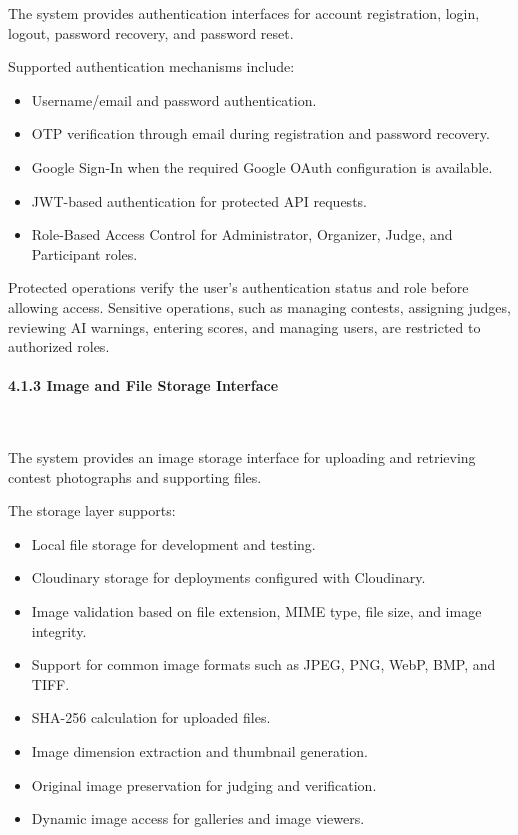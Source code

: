 The system provides authentication interfaces for account registration, login, logout, password recovery, and password reset.

Supported authentication mechanisms include:

\begin{itemize}[leftmargin=1.5em, nosep]
    \item Username/email and password authentication.
    \item OTP verification through email during registration and password recovery.
    \item Google Sign-In when the required Google OAuth configuration is available.
    \item JWT-based authentication for protected API requests.
    \item Role-Based Access Control for Administrator, Organizer, Judge, and Participant roles.
\end{itemize}

Protected operations verify the user's authentication status and role before allowing access. Sensitive operations, such as managing contests, assigning judges, reviewing AI warnings, entering scores, and managing users, are restricted to authorized roles.

\paragraph*{4.1.3 Image and File Storage Interface}\leavevmode\\[-0.5em]
\label{par:image-file-storage-interface}

The system provides an image storage interface for uploading and retrieving contest photographs and supporting files.

The storage layer supports:

\begin{itemize}[leftmargin=1.5em, nosep]
    \item Local file storage for development and testing.
    \item Cloudinary storage for deployments configured with Cloudinary.
    \item Image validation based on file extension, MIME type, file size, and image integrity.
    \item Support for common image formats such as JPEG, PNG, WebP, BMP, and TIFF.
    \item SHA-256 calculation for uploaded files.
    \item Image dimension extraction and thumbnail generation.
    \item Original image preservation for judging and verification.
    \item Dynamic image access for galleries and image viewers.
\end{itemize}

